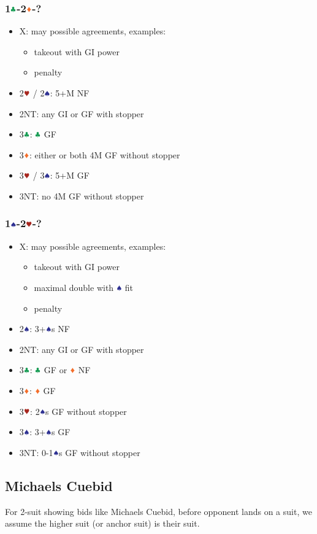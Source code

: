 \documentclass{article}
\newcommand*{\ccc}{\textcolor{ForestGreen}{\clubsuit}}
\newcommand*{\ddd}{\textcolor{Orange}{\vardiamondsuit}}
\newcommand*{\hhh}{\textcolor{Mahogany}{\varheartsuit}}
\newcommand*{\sss}{\textcolor{Blue}{\spadesuit}}
\begin{document}
\begin{multicols}{2}
\subsubsection{1$\ccc$-2$\ddd$-?}
\begin{itemize}
    \item X: may possible agreements, examples:
    \begin{itemize}
        \item takeout with GI power
        \item penalty
    \end{itemize}
    \item 2$\hhh$ / 2$\sss$: 5+M NF
    \item 2NT: any GI or GF with stopper
    \item 3$\ccc$: $\ccc$ GF
    \item 3$\ddd$: either or both 4M GF without stopper
    \item 3$\hhh$ / 3$\sss$: 5+M GF
    \item 3NT: no 4M GF without stopper
\end{itemize}

\subsubsection{1$\sss$-2$\hhh$-?}
\begin{itemize}
    \item X: may possible agreements, examples:
    \begin{itemize}
        \item takeout with GI power
        \item maximal double with $\sss$ fit
        \item penalty
    \end{itemize}
    \item 2$\sss$: 3+$\sss$s NF
    \item 2NT: any GI or GF with stopper
    \item 3$\ccc$: $\ccc$ GF or $\ddd$ NF
    \item 3$\ddd$: $\ddd$ GF
    \item 3$\hhh$: 2$\sss$s GF without stopper
    \item 3$\sss$: 3+$\sss$s GF
    \item 3NT: 0-1$\sss$s GF without stopper
\end{itemize}

\subsection{Michaels Cuebid}
For 2-suit showing bids like Michaels Cuebid, before opponent lands on a suit, we assume the higher suit (or anchor suit) is their suit.

\end{multicols}
\end{document}
